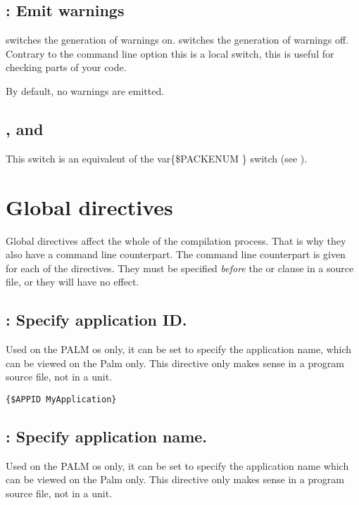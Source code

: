 \subsection{ : Emit warnings}

 switches the generation of warnings on.
 switches the generation of warnings off.
Contrary to the command line option  this
is a local switch, this is useful for checking parts of your code.

By default, no warnings are emitted.

\subsection{,  and }

This switch is an equivalent of the var{\{\$PACKENUM \}} switch
(see ).

\section{Global directives}
\label{se:GlobalSwitch}
Global directives affect the whole of the compilation process. That is why
they also have a command line counterpart. The command line counterpart is
given for each of the directives. They must be specified {\em before} the
 or  clause in a source file, or they will have no
effect.

\subsection{ : Specify application ID.}
Used on the PALM os only, it can be set to specify the application name,
which can be viewed on the Palm only. This directive only makes sense in a
program source file, not in a unit.

\begin{verbatim}
{$APPID MyApplication}
\end{verbatim}

\subsection{ : Specify application name.}
Used on the PALM os only, it can be set to specify the application name
which can be viewed on the Palm only. This directive only makes sense in a
program source file, not in a unit.

